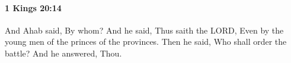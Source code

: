 
		\paragraph{1 Kings 20:14} %
			\label{1KINGS-20-14}

			And Ahab said, By whom? And he said, Thus saith the LORD, Even by the young men of the princes of the provinces. Then he said, Who shall order the battle? And he answered, Thou.


